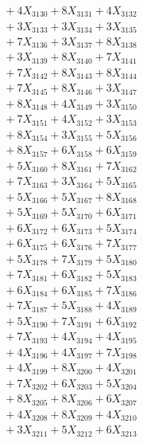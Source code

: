 \documentclass[a4paper,10pt]{article}
\begin{document}
{\begin{align}
&\;  + 4 X_{3130} + 8 X_{3131} + 4 X_{3132} \\[0.3ex]
&\;  + 3 X_{3133} + 3 X_{3134} + 3 X_{3135} \\[0.3ex]
&\;  + 7 X_{3136} + 3 X_{3137} + 8 X_{3138} \\[0.3ex]
&\;  + 3 X_{3139} + 8 X_{3140} + 7 X_{3141} \\[0.3ex]
&\;  + 7 X_{3142} + 8 X_{3143} + 8 X_{3144} \\[0.3ex]
&\;  + 7 X_{3145} + 8 X_{3146} + 3 X_{3147} \\[0.3ex]
&\;  + 8 X_{3148} + 4 X_{3149} + 3 X_{3150} \\[0.3ex]
&\;  + 7 X_{3151} + 4 X_{3152} + 3 X_{3153} \\[0.3ex]
&\;  + 8 X_{3154} + 3 X_{3155} + 5 X_{3156} \\[0.3ex]
&\;  + 8 X_{3157} + 6 X_{3158} + 6 X_{3159} \\[0.5ex]\allowbreak
&\;  + 5 X_{3160} + 8 X_{3161} + 7 X_{3162} \\[0.3ex]
&\;  + 7 X_{3163} + 3 X_{3164} + 5 X_{3165} \\[0.3ex]
&\;  + 5 X_{3166} + 5 X_{3167} + 8 X_{3168} \\[0.3ex]
&\;  + 5 X_{3169} + 5 X_{3170} + 6 X_{3171} \\[0.3ex]
&\;  + 6 X_{3172} + 6 X_{3173} + 5 X_{3174} \\[0.3ex]
&\;  + 6 X_{3175} + 6 X_{3176} + 7 X_{3177} \\[0.3ex]
&\;  + 5 X_{3178} + 7 X_{3179} + 5 X_{3180} \\[0.3ex]
&\;  + 7 X_{3181} + 6 X_{3182} + 5 X_{3183} \\[0.3ex]
&\;  + 6 X_{3184} + 6 X_{3185} + 7 X_{3186} \\[0.3ex]
&\;  + 7 X_{3187} + 5 X_{3188} + 4 X_{3189} \\[0.5ex]\allowbreak
&\;  + 5 X_{3190} + 7 X_{3191} + 6 X_{3192} \\[0.3ex]
&\;  + 7 X_{3193} + 4 X_{3194} + 4 X_{3195} \\[0.3ex]
&\;  + 4 X_{3196} + 4 X_{3197} + 7 X_{3198} \\[0.3ex]
&\;  + 4 X_{3199} + 8 X_{3200} + 4 X_{3201} \\[0.3ex]
&\;  + 7 X_{3202} + 6 X_{3203} + 5 X_{3204} \\[0.3ex]
&\;  + 8 X_{3205} + 8 X_{3206} + 6 X_{3207} \\[0.3ex]
&\;  + 4 X_{3208} + 8 X_{3209} + 4 X_{3210} \\[0.3ex]
&\;  + 3 X_{3211} + 5 X_{3212} + 6 X_{3213} \\[0.3ex]

\end{align}}
\end{document}
